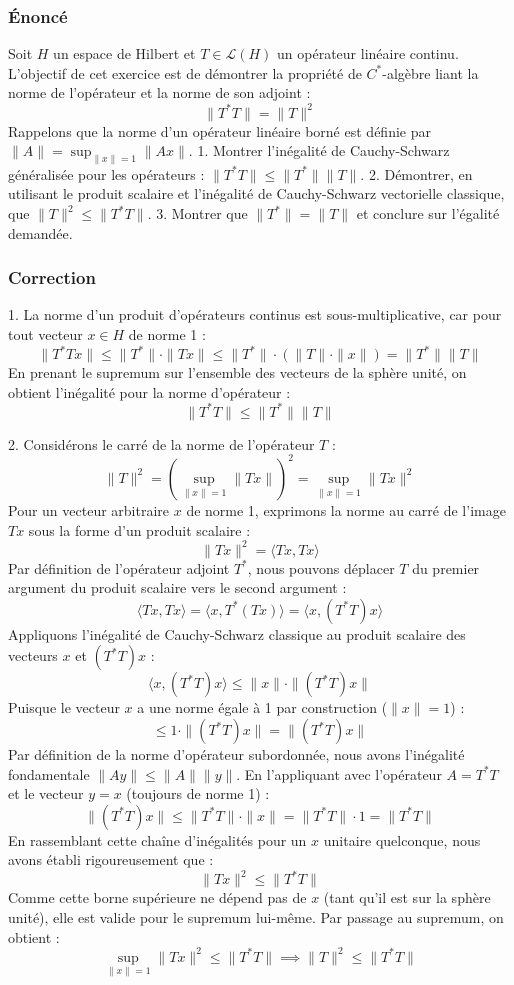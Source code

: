 \documentclass[11pt,a4paper]{article}
\begin{document}
\subsubsection*{Énoncé}
Soit $H$ un espace de Hilbert et $T \in \mathcal{L}(H)$ un opérateur linéaire continu.
L'objectif de cet exercice est de démontrer la propriété de $C^*$-algèbre liant la norme de l'opérateur et la norme de son adjoint :
$$ \|T^* T\| = \|T\|^2 $$
Rappelons que la norme d'un opérateur linéaire borné est définie par $\|A\| = \sup_{\|x\|=1} \|Ax\|$.
1. Montrer l'inégalité de Cauchy-Schwarz généralisée pour les opérateurs : $\|T^* T\| \le \|T^*\| \|T\|$.
2. Démontrer, en utilisant le produit scalaire et l'inégalité de Cauchy-Schwarz vectorielle classique, que $\|T\|^2 \le \|T^* T\|$.
3. Montrer que $\|T^*\| = \|T\|$ et conclure sur l'égalité demandée.

\subsubsection*{Correction}
1. La norme d'un produit d'opérateurs continus est sous-multiplicative, car pour tout vecteur $x \in H$ de norme 1 :
$$ \|T^* T x\| \le \|T^*\| \cdot \|Tx\| \le \|T^*\| \cdot (\|T\| \cdot \|x\|) = \|T^*\| \|T\| $$
En prenant le supremum sur l'ensemble des vecteurs de la sphère unité, on obtient l'inégalité pour la norme d'opérateur :
$$ \|T^* T\| \le \|T^*\| \|T\| $$

2. Considérons le carré de la norme de l'opérateur $T$ :
$$ \|T\|^2 = \left( \sup_{\|x\|=1} \|Tx\| \right)^2 = \sup_{\|x\|=1} \|Tx\|^2 $$
Pour un vecteur arbitraire $x$ de norme 1, exprimons la norme au carré de l'image $Tx$ sous la forme d'un produit scalaire :
$$ \|Tx\|^2 = \langle Tx, Tx \rangle $$
Par définition de l'opérateur adjoint $T^*$, nous pouvons déplacer $T$ du premier argument du produit scalaire vers le second argument :
$$ \langle Tx, Tx \rangle = \langle x, T^*(Tx) \rangle = \langle x, (T^*T)x \rangle $$
Appliquons l'inégalité de Cauchy-Schwarz classique au produit scalaire des vecteurs $x$ et $(T^*T)x$ :
$$ \langle x, (T^*T)x \rangle \le \|x\| \cdot \|(T^*T)x\| $$
Puisque le vecteur $x$ a une norme égale à 1 par construction ($\|x\|=1$) :
$$ \le 1 \cdot \|(T^*T)x\| = \|(T^*T)x\| $$
Par définition de la norme d'opérateur subordonnée, nous avons l'inégalité fondamentale $\|Ay\| \le \|A\|\|y\|$. En l'appliquant avec l'opérateur $A = T^*T$ et le vecteur $y = x$ (toujours de norme 1) :
$$ \|(T^*T)x\| \le \|T^*T\| \cdot \|x\| = \|T^*T\| \cdot 1 = \|T^*T\| $$
En rassemblant cette chaîne d'inégalités pour un $x$ unitaire quelconque, nous avons établi rigoureusement que :
$$ \|Tx\|^2 \le \|T^*T\| $$
Comme cette borne supérieure ne dépend pas de $x$ (tant qu'il est sur la sphère unité), elle est valide pour le supremum lui-même. Par passage au supremum, on obtient :
$$ \sup_{\|x\|=1} \|Tx\|^2 \le \|T^*T\| \implies \|T\|^2 \le \|T^*T\| $$
\end{document}
